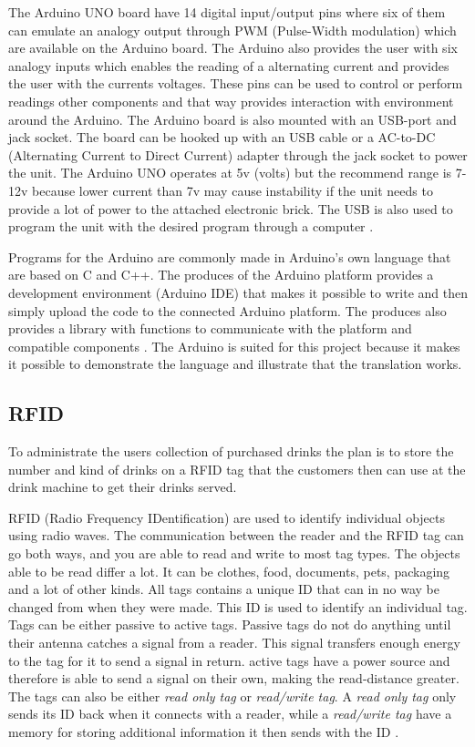 The Arduino UNO board have 14 digital input/output pins where six of them can emulate an analogy output through PWM (Pulse-Width modulation) which are available on the Arduino board. The Arduino also provides the user with six analogy inputs which enables the reading of a alternating current and provides the user with the currents voltages. These pins can be used to control or perform readings other components and that way provides interaction with environment around the Arduino.
The Arduino board is also mounted with an USB-port and jack socket. The board can be hooked up with an USB cable or a AC-to-DC (Alternating Current to Direct Current) adapter through the jack socket to power the unit. The Arduino UNO operates at 5v (volts) but the recommend range is 7-12v because lower current than 7v may cause instability if the unit needs to provide a lot of power to the attached electronic brick. The USB is also used to program the unit with the desired program through a computer \citep{ArduinoUno}.

Programs for the Arduino are commonly made in Arduino's own language that are based on C and C++. The produces of the Arduino platform provides a development environment (Arduino IDE) that makes it possible to write and then simply upload the code to the connected Arduino platform. The produces also provides a library with functions to communicate with the platform and compatible components \citep{ArduinoLanguage}.
The Arduino is suited for this project because it makes it possible to demonstrate the language and illustrate that the translation works. 

\subsection{RFID}
To administrate the users collection of purchased drinks the plan is to store the number and kind of drinks on a RFID tag that the customers then can use at the drink machine to get their drinks served.

RFID (Radio Frequency IDentification) are used to identify individual objects using radio waves.
The communication between the reader and the RFID tag can go both ways, and you are able to read and write to most tag types. 
The objects able to be read differ a lot. It can be clothes, food, documents, pets, packaging and a lot of other kinds. 
All tags contains a unique ID that can in no way be changed from when they were made. This ID is used to identify an individual tag.
Tags can be either passive to active tags. Passive tags do not do anything until their antenna catches a signal from a reader. This signal transfers enough energy to the tag for it to send a signal in return. active tags have a power source and therefore is able to send a signal on their own, making the read-distance greater.
The tags can also be either \textit{read only tag} or \textit{read/write tag}. A \textit{read only tag} only sends its ID back when it connects with a reader, while a \textit{read/write tag} have a memory for storing additional information it then sends with the ID \citep{RFID}.


